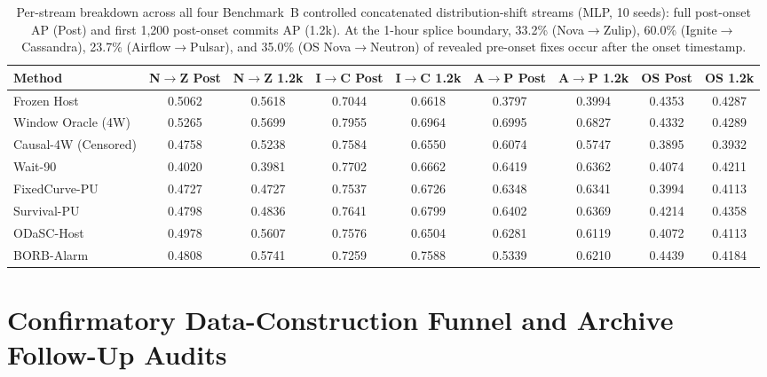 \documentclass[10pt,a4paper]{article}
\begin{document}
\begin{table}[!htbp]
\centering
\caption{Per-stream breakdown across all four Benchmark~B controlled concatenated distribution-shift streams (MLP, 10 seeds): full post-onset AP (Post) and first 1,200 post-onset commits AP (1.2k). At the 1-hour splice boundary, 33.2\% (Nova$\to$Zulip), 60.0\% (Ignite$\to$Cassandra), 23.7\% (Airflow$\to$Pulsar), and 35.0\% (OS Nova$\to$Neutron) of revealed pre-onset fixes occur after the onset timestamp.}
\label{tab:shift_4streams}
\fontsize{7.5}{9.0}\selectfont
\setlength{\tabcolsep}{1.8pt}
\begin{tabular*}{\textwidth}{@{\extracolsep\fill}lcccccccc@{}}
\toprule
\textbf{Method} & \textbf{N$\to$Z Post} & \textbf{N$\to$Z 1.2k} & \textbf{I$\to$C Post} & \textbf{I$\to$C 1.2k} & \textbf{A$\to$P Post} & \textbf{A$\to$P 1.2k} & \textbf{OS Post} & \textbf{OS 1.2k} \\
\midrule
Frozen Host & 0.5062 & 0.5618 & 0.7044 & 0.6618 & 0.3797 & 0.3994 & 0.4353 & 0.4287 \\
Window Oracle (4W) & 0.5265 & 0.5699 & 0.7955 & 0.6964 & 0.6995 & 0.6827 & 0.4332 & 0.4289 \\
\midrule
Causal-4W (Censored) & 0.4758 & 0.5238 & 0.7584 & 0.6550 & 0.6074 & 0.5747 & 0.3895 & 0.3932 \\
Wait-90 & 0.4020 & 0.3981 & 0.7702 & 0.6662 & 0.6419 & 0.6362 & 0.4074 & 0.4211 \\
FixedCurve-PU & 0.4727 & 0.4727 & 0.7537 & 0.6726 & 0.6348 & 0.6341 & 0.3994 & 0.4113 \\
Survival-PU & 0.4798 & 0.4836 & 0.7641 & 0.6799 & 0.6402 & 0.6369 & 0.4214 & 0.4358 \\
ODaSC-Host & 0.4978 & 0.5607 & 0.7576 & 0.6504 & 0.6281 & 0.6119 & 0.4072 & 0.4113 \\
BORB-Alarm & 0.4808 & 0.5741 & 0.7259 & 0.7588 & 0.5339 & 0.6210 & 0.4439 & 0.4184 \\
\bottomrule
\end{tabular*}
\end{table}

\clearpage
\section{Confirmatory Data-Construction Funnel and Archive Follow-Up Audits}
\label{sec:or_funnel}
\end{document}
